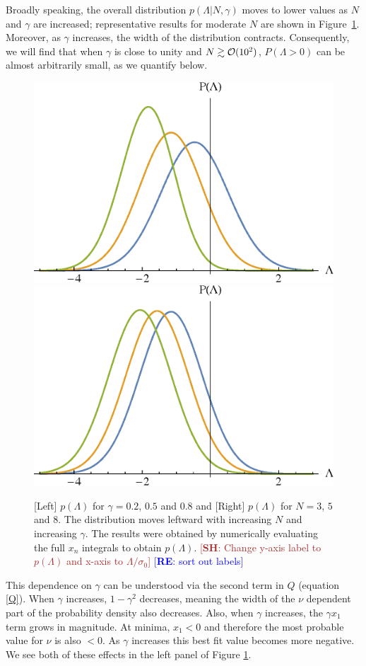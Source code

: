 \documentclass[12pt]{article}
\newcommand{\re}[1]{\textcolor{blue}{[{\bf RE}: #1]}}
\newcommand{\SH}[1]{\textcolor{brown}{[{\bf SH}: #1]}}
\begin{document}
Broadly speaking, the overall distribution $p(\Lambda | N,\gamma)$ moves to lower values as $N$ and $\gamma$ are increased;  representative results for moderate $N$ are shown in Figure~\ref{distributions}. Moreover, as $\gamma$ increases, the width of the distribution contracts. Consequently, we will find that when $\gamma$ is close to unity and $N \gtrsim {\cal{O}}(10^2)$, $P(\Lambda >0)$ can be almost arbitrarily small, as we quantify below. 


\begin{figure}
  \centering
  \includegraphics[width=0.45 \linewidth]{PLam_gamma.eps}  \hfill
  \includegraphics[width=0.45 \linewidth]{PLam_N.eps}
  \caption{[Left] $p(\Lambda)$ for $\gamma = 0.2$, $0.5$ and $0.8$ and [Right] $p(\Lambda)$ for $N=3$, $5$ and $8$. The distribution moves leftward with increasing $N$ and increasing $\gamma$. The results were obtained by numerically evaluating the full $x_n$ integrals to obtain $p(\Lambda)$. \SH{Change y-axis label to $p(\Lambda)$ and x-axis to $\Lambda/\sigma_0$} \re{sort out labels}}
  \label{distributions}
  \end{figure}

This dependence on $\gamma$ can be understood via the second term in $Q$ (equation \eqref{Q}). When $\gamma$ increases, $1-\gamma^2$ decreases, meaning the width of the $\nu$ dependent part of the probability density also decreases. Also, when $\gamma$ increases, the $\gamma x_1$ term grows in magnitude. At minima, $x_1 <0$ and therefore the most probable value for $\nu$ is also $<0$. As $\gamma$ increases this best fit value becomes more negative. We see both of these effects in the left panel of Figure \ref{distributions}.
\end{document}
